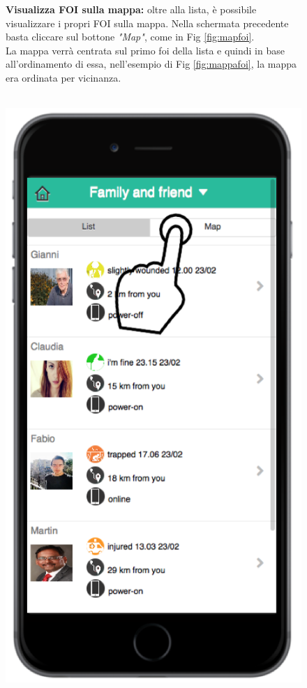  \begin{figure}
 \textbf{Visualizza FOI sulla mappa:} oltre alla lista, è possibile visualizzare i propri FOI sulla mappa. Nella schermata precedente basta cliccare sul bottone \textit{"Map"}, come in Fig \ref{fig:mapfoi}.\\
 La mappa verrà centrata sul primo foi della lista e quindi in base all'ordinamento di essa, nell'esempio di Fig \ref{fig:mappafoi}, la mappa era ordinata per vicinanza.
 \\ \\
 \begin{minipage}[b]{6cm}
   \centering
\includegraphics[scale=0.9]{interfaccia/mapfoi.png}

\end{minipage}
\end{figure}
